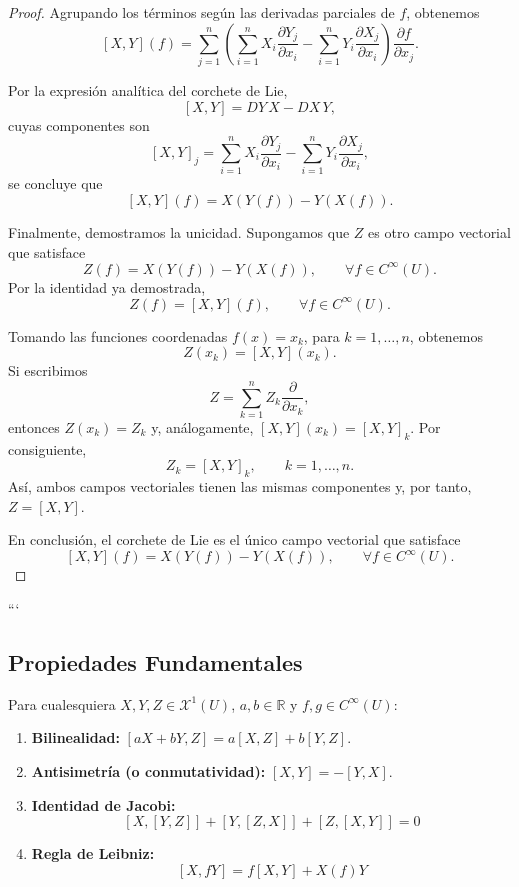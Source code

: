 \documentclass[11pt,a4paper]{article}
\theoremstyle{definition}
\theoremstyle{plain}
\theoremstyle{remark}
\begin{document}
\begin{proof}
		Agrupando los términos según las derivadas parciales de $f$, obtenemos
		\[
		[X,Y](f)
		=\sum_{j=1}^{n}
		\left(
		\sum_{i=1}^{n}X_i\frac{\partial Y_j}{\partial x_i}
		-\sum_{i=1}^{n}Y_i\frac{\partial X_j}{\partial x_i}
		\right)
		\frac{\partial f}{\partial x_j}.
		\]
		
		Por la expresión analítica del corchete de Lie,
		\[
		[X,Y]=DY\,X-DX\,Y,
		\]
		cuyas componentes son
		\[
		[X,Y]_j
		=\sum_{i=1}^{n}X_i\frac{\partial Y_j}{\partial x_i}
		-\sum_{i=1}^{n}Y_i\frac{\partial X_j}{\partial x_i},
		\]
		se concluye que
		\[
		\boxed{[X,Y](f)=X(Y(f))-Y(X(f)).}
		\]
		
		Finalmente, demostramos la unicidad. Supongamos que $Z$ es otro
		campo vectorial que satisface
		\[
		Z(f)=X(Y(f))-Y(X(f)),
		\qquad \forall f\in C^\infty(U).
		\]
		Por la identidad ya demostrada,
		\[
		Z(f)=[X,Y](f),
		\qquad \forall f\in C^\infty(U).
		\]
		
		Tomando las funciones coordenadas $f(x)=x_k$, para
		$k=1,\ldots,n$, obtenemos
		\[
		Z(x_k)=[X,Y](x_k).
		\]
		Si escribimos
		\[
		Z=\sum_{k=1}^{n}Z_k\frac{\partial}{\partial x_k},
		\]
		entonces $Z(x_k)=Z_k$ y, análogamente,
		$[X,Y](x_k)=[X,Y]_k$. Por consiguiente,
		\[
		Z_k=[X,Y]_k,\qquad k=1,\ldots,n.
		\]
		Así, ambos campos vectoriales tienen las mismas componentes y,
		por tanto, $Z=[X,Y]$.
		
		En conclusión, el corchete de Lie es el único campo vectorial que
		satisface
		\[
		\boxed{
			[X,Y](f)=X(Y(f))-Y(X(f)),
			\qquad \forall f\in C^\infty(U).
		}
		\]
	\end{proof}
	```
	\subsection*{Propiedades Fundamentales}
	
	Para cualesquiera $X, Y, Z \in \mathcal{X}^1(U)$, $a, b \in \mathbb{R}$ y $f, g \in C^\infty(U)$:
	\begin{enumerate}
		\item \textbf{Bilinealidad:} $[a X + b Y, Z] = a [X, Z] + b [Y, Z]$.
		\item \textbf{Antisimetría (o conmutatividad):} $[X, Y] = -[Y, X]$.
		\item \textbf{Identidad de Jacobi:} 
		\[
		[X, [Y, Z]] + [Y, [Z, X]] + [Z, [X, Y]] = 0
		\]
		\item \textbf{Regla de Leibniz:} 
		\[
		[X, f Y] = f [X, Y] + X(f) Y
		\]
	\end{enumerate}
	
\end{document}

